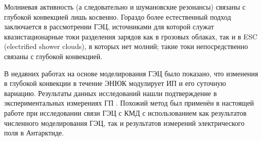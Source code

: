 Молниевая активность (а следовательно и шумановские резонансы) связаны с глубокой конвекцией лишь косвенно. Гораздо более естественный подход заключается в рассмотрении ГЭЦ, источниками для которой служат квазистационарные токи разделения зарядов как в грозовых облаках, так и в ESC (electrified shower clouds), в которых нет молний; такие токи непосредственно связаны с глубокой конвекцией.

В недавних работах \cite{Slyunyaev_et_al_2021a,Slyunyaev_et_al_2021b} на основе моделирования ГЭЦ было показано, что изменения в глубокой конвекции в течение ЭНЮК модулирует ИП и его суточную вариацию. Результаты данных исследований нашли подтверждение в экспериментальных измерениях ГП \cite{Harrison_et_al_2011,Slyunyaev_et_al_2021c}. Похожий метод был применён в настоящей работе при исследовании связи ГЭЦ с КМД с использованием как результатов численного моделирования ГЭЦ, так и результатов измерений электрического поля в Антарктиде.
